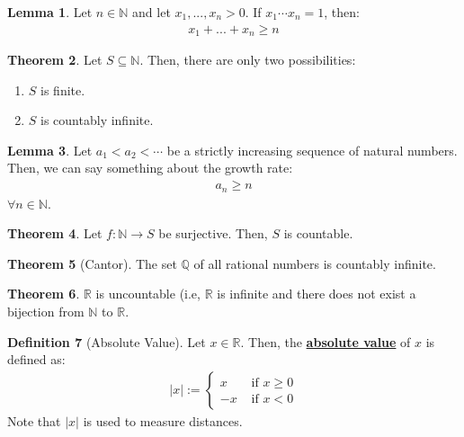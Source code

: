 \documentclass[reqno,11pt]{amsart}
\theoremstyle{definition}
\newtheorem{theorem}{Theorem}
\newtheorem{lemma}[theorem]{Lemma}
\theoremstyle{definition}
\newtheorem{definition}[theorem]{Definition}
\theoremstyle{remark}
\newcommand{\R}{\mathbb{R}}
\newcommand{\dfn}[1]{\underline{\textbf{#1}}}
\begin{document}
\begin{lemma}
	Let $n \in \mathbb{N}$ and let $x_1, ... , x_n > 0$. If $x_1 \cdots x_n = 1$, then: 
	\begin{align}
		x_1 + ... + x_n \geq n	
	\end{align}
\end{lemma}

\begin{theorem}
	Let $S \subseteq \mathbb{N}$. Then, there are only two possibilities: 
	\begin{enumerate}[noitemsep]
		\item $S$ is finite. 
		\item $S$ is countably infinite.
	\end{enumerate}
\end{theorem}

\begin{lemma}
	Let $a_1 < a_2 < \cdots $ be a strictly increasing sequence of natural numbers. Then, we can say something about the growth rate: 
	\begin{align}
		a_n \geq n 	
	\end{align}
	$\forall n \in \mathbb{N}$.
\end{lemma}

\begin{theorem}
	Let $f: \mathbb{N} \rightarrow S$ be surjective. Then, $S$ is countable.
\end{theorem}

\begin{theorem}[Cantor]
	The set $\mathbb{Q}$  of all rational numbers is countably infinite.
\end{theorem}

\begin{theorem}
	$\R$ is uncountable (i.e, $\R$ is infinite and there does not exist a bijection from $\mathbb{N}$ to $\R$.
\end{theorem}

\begin{definition}[Absolute Value]
	Let $x \in \R$. Then, the \dfn{absolute value} of $x$ is defined as:
	\begin{align}
		|x| := \begin{cases}
			x & \text{ if } x \geq 0 \\
			-x & \text{ if } x < 0 
		\end{cases}	
	\end{align}
	Note that $|x|$ is used to measure distances.	
\end{definition}
\end{document}
